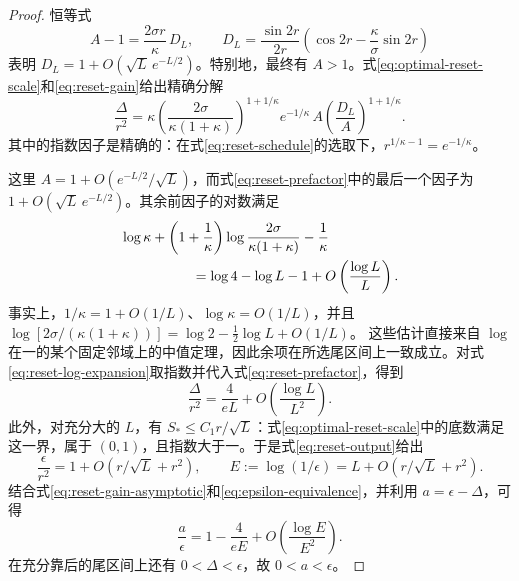 \documentclass[UTF8,11pt,a4paper,fontset=fandol]{ctexart}
\theoremstyle{definition}
\theoremstyle{remark}
\begin{document}
\begin{proof}
恒等式
\begin{equation}\label{eq:reset-correction}
 A-1=\frac{2\sigma r}{\kappa}\,D_L,\qquad
 D_L=\frac{\sin2r}{2r}
 \left(\cos2r-\frac\kappa\sigma\sin2r\right)
\end{equation}
表明 \(D_L=1+O(\sqrt L\,e^{-L/2})\)。特别地，最终有 \(A>1\)。式\eqref{eq:optimal-reset-scale}和\eqref{eq:reset-gain}给出精确分解
\begin{equation}\label{eq:reset-prefactor}
 \frac{\Delta}{r^2}
 =\kappa\left(\frac{2\sigma}{\kappa(1+\kappa)}\right)^{1+1/\kappa}
 e^{-1/\kappa}\,
 A\left(\frac{D_L}{A}\right)^{1+1/\kappa}.
\end{equation}
其中的指数因子是精确的：在式\eqref{eq:reset-schedule}的选取下，\(r^{1/\kappa-1}=e^{-1/\kappa}\)。

这里 \(A=1+O(e^{-L/2}/\sqrt L)\)，而式\eqref{eq:reset-prefactor}中的最后一个因子为 \(1+O(\sqrt L\,e^{-L/2})\)。其余前因子的对数满足
\begin{equation}\label{eq:reset-log-expansion}
 \begin{aligned}
 &\log\kappa+\left(1+\frac1\kappa\right)
   \log\frac{2\sigma}{\kappa(1+\kappa)}-\frac1\kappa\\
 &\hspace{18mm}=\log4-\log L-1+O\left(\frac{\log L}{L}\right).
 \end{aligned}
\end{equation}
事实上，\(1/\kappa=1+O(1/L)\)、\(\log\kappa=O(1/L)\)，并且
\(\log[2\sigma/(\kappa(1+\kappa))]=\log2-\tfrac12\log L+O(1/L)\)。
这些估计直接来自 \(\log\) 在一的某个固定邻域上的中值定理，因此余项在所选尾区间上一致成立。对式\eqref{eq:reset-log-expansion}取指数并代入式\eqref{eq:reset-prefactor}，得到
\begin{equation}\label{eq:reset-gain-asymptotic}
 \frac{\Delta}{r^2}=\frac{4}{eL}+O\left(\frac{\log L}{L^2}\right).
\end{equation}
此外，对充分大的 \(L\)，有 \(S_*\leq C_1r/\sqrt L\)：式\eqref{eq:optimal-reset-scale}中的底数满足这一界，属于 \((0,1)\)，且指数大于一。于是式\eqref{eq:reset-output}给出
\begin{equation}\label{eq:epsilon-equivalence}
 \frac\epsilon{r^2}=1+O(r/\sqrt L+r^2),\qquad
 E:=\log(1/\epsilon)=L+O(r/\sqrt L+r^2).
\end{equation}
结合式\eqref{eq:reset-gain-asymptotic}和\eqref{eq:epsilon-equivalence}，并利用 \(a=\epsilon-\Delta\)，可得
\[
 \frac a\epsilon=1-\frac4{eE}+O\left(\frac{\log E}{E^2}\right).
\]
在充分靠后的尾区间上还有 \(0<\Delta<\epsilon\)，故 \(0<a<\epsilon\)。


\end{proof}
\end{document}
